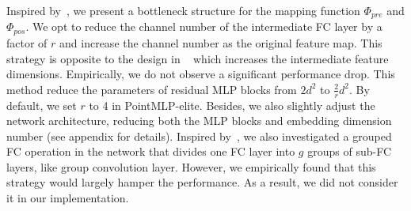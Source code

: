 Inspired by~\citet{he2016deep,hu2018squeeze}, we present a bottleneck structure for the mapping function $\Phi_{pre}$ and $\Phi_{pos}$. We opt to reduce the channel number of the intermediate FC layer by a factor of $r$ and increase the channel number as the original feature map. This strategy is opposite to the design in ~\citet{vaswani2017attention,touvron2021resmlp} which increases the intermediate feature dimensions. Empirically, we do not observe a significant performance drop. This method reduce the parameters of residual MLP blocks from $2d^2$ to $\frac{2}{r}d^2$. By default, we set $r$ to 4 in PointMLP-elite.
Besides, we also slightly adjust the network architecture, reducing both the MLP blocks and embedding dimension number (see appendix for details).
Inspired by~\citet{xie2017aggregated}, we also investigated a grouped FC operation in the network that divides one FC layer into $g$ groups of sub-FC layers, like group convolution layer. However, we empirically found that this strategy would largely hamper the performance. As a result, we did not consider it in our implementation.

